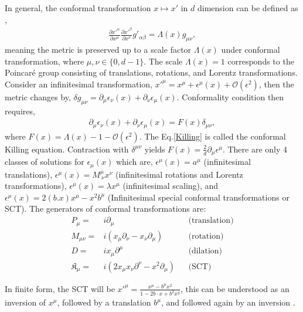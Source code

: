 \documentclass[%
 reprint,
superscriptaddress,
 amsmath,amssymb,
 aps,
]{revtex4-2}
\begin{document}
In general, the conformal transformation $x\longmapsto x'$ in $d$ dimension can be defined as \cite{Francesco,Blumenhagen}, 
\begin{align}
    \frac{\partial x'^{\alpha}}{\partial x^{\mu}}\frac{\partial x'^{\beta}}{\partial x^{\nu}}g'_{\alpha\beta}=\Lambda(x)g_{\mu\nu},
\end{align}
meaning the metric is preserved up to a scale factor $\Lambda(x)$ under conformal transformation, where $\mu,\nu\in\{0,d-1\}$. The scale $\Lambda(x)=1$ corresponds to the Poincar\'e group consisting of translations, rotations, and Lorentz transformations. Consider an infinitesimal transformation, $x'^{\mu}=x^{\mu}+\epsilon^{\mu}(x)+\mathcal{O}(\epsilon^2)$, then the metric changes by, $\delta g_{\mu\nu}=\partial_{\mu}\epsilon_{\nu}(x)+\partial_{\nu}\epsilon_{\mu}(x)$. Conformality condition then requires, 
\begin{align}
    \partial_{\mu}\epsilon_{\nu}(x)+\partial_{\nu}\epsilon_{\mu}(x)=F(x)\delta_{\mu\nu},\label{Killing}
\end{align}
where $F(x)=\Lambda(x)-1-\mathcal{O}(\epsilon^2)$. The Eq.\eqref{Killing} is called the conformal Killing equation. Contraction with $\delta^{\mu\nu}$ yields $F(x)=\frac{2}{d}\partial_{\mu}\epsilon^{\mu}$. There are only 4 classes of solutions for $\epsilon_{\mu}(x)$ which are, $\epsilon^{\mu}(x)=a^{\mu}$ (infinitesimal translations), $\epsilon^{\mu}(x)=M^{\mu}_{~\nu}x^{\nu}$ (infinitesimal rotations and Lorentz transformations), $\epsilon^{\mu}(x)=\lambda x^{\mu}$ (infinitesimal scaling), and $\epsilon^{\mu}(x)=2(b.x) x^{\mu}-x^2b^{\mu}$ (Infinitesimal special conformal transformations or SCT). The generators of conformal transformations are: 
\begin{align}
    P_{{\mu}}=&i\partial_{{\mu}}&& \text{(translation)}\\
    M_{{\mu}{\nu}}=&i\left(x_{{\mu}}\partial_{{\nu}}-x_{{\nu}}\partial_{{\mu}}\right)&& \text{(rotation)}\\
    D=&ix_{{\mu}}\partial^{{\mu}}&& \text{(dilation)}\\
    \mathfrak{K}_{{\mu}}=&i\left(2x_{{\mu}}x_{{\nu}}\partial^{{\nu}}-x^2\partial_{{\mu}}\right)&& \text{(SCT)}
\end{align}


In finite form, the SCT will be $x'^{\mu }={\frac {x^{\mu }-b^{\mu }x^{2}}{1-2b\cdot x+b^{2}x^{2}}}$, this can be understood as an inversion of $x^\mu$, followed by a translation $b^\mu$, and followed again by an inversion \cite{Blumenhagen}.
\end{document}
